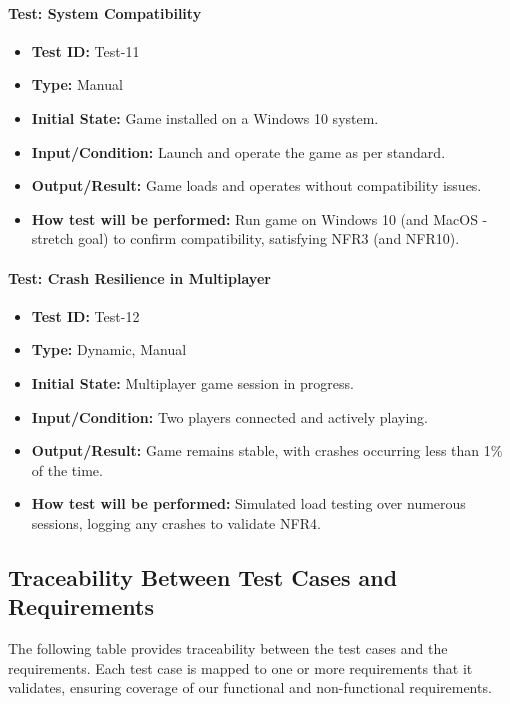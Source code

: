 \documentclass[12pt, titlepage]{article}
\begin{document}
\paragraph{Test: System Compatibility}
\begin{itemize}
    \item \textbf{Test ID:} Test-11
    \item \textbf{Type:} Manual
    \item \textbf{Initial State:} Game installed on a Windows 10 system.
    \item \textbf{Input/Condition:} Launch and operate the game as per standard.
    \item \textbf{Output/Result:} Game loads and operates without compatibility issues.
    \item \textbf{How test will be performed:} Run game on Windows 10 (and MacOS - stretch goal) to confirm compatibility, satisfying NFR3 (and NFR10).
\end{itemize}

\paragraph{Test: Crash Resilience in Multiplayer}
\begin{itemize}
    \item \textbf{Test ID:} Test-12
    \item \textbf{Type:} Dynamic, Manual
    \item \textbf{Initial State:} Multiplayer game session in progress.
    \item \textbf{Input/Condition:} Two players connected and actively playing.
    \item \textbf{Output/Result:} Game remains stable, with crashes occurring less than 1\% of the time.
    \item \textbf{How test will be performed:} Simulated load testing over numerous sessions, logging any crashes to validate NFR4.
\end{itemize}


\subsection{Traceability Between Test Cases and Requirements}

The following table provides traceability between the test cases and the requirements. Each test case is mapped to one or more requirements that it validates, ensuring coverage of our functional and non-functional requirements.
\end{document}
